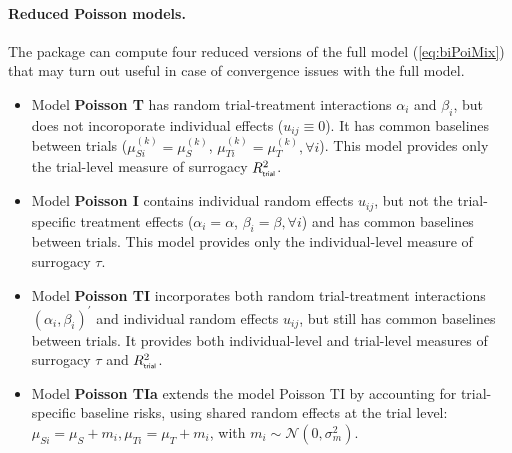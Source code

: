 \documentclass[article,shortnames, nojss]{jss}\usepackage[]{graphicx}\usepackage[]{color}
\begin{document}
\paragraph{Reduced Poisson models.}
The  package can compute four reduced versions 
  of the full model (\ref{eq:biPoiMix})
  that may turn out useful in case of convergence issues with the full model.
\begin{itemize}
\item Model \textbf{Poisson T} has
  random trial-treatment interactions $\alpha_i$ and $\beta_i$,
  but does not incoroporate individual effects ($u_{ij} \equiv 0$).
It has common baselines between trials
($\mu^{(k)}_{Si} = \mu^{(k)}_{S}$, $\mu^{(k)}_{Ti} = \mu^{(k)}_{T},
\forall i$).
This model provides only the trial-level measure of surrogacy
$R^2_{\textsf{\tiny trial}}$.

\item Model \textbf{Poisson I} contains individual random effects $u_{ij}$,
but not the trial-specific treatment effects 
($\alpha_i = \alpha$, $\beta_i = \beta, \forall i$)
and has common baselines between trials.
This model provides only the individual-level measure of surrogacy
$\tau$.

\item Model \textbf{Poisson TI} incorporates
both random trial-treatment interactions
$(\alpha_i, \beta_i)^\prime$
and individual random effects $u_{ij}$,
but still has common baselines between trials.
It provides both individual-level and trial-level measures of surrogacy
$\tau$ and $R^2_{\textsf{\tiny trial}}$.

\item Model \textbf{Poisson TIa} extends the model Poisson TI
by accounting for trial-specific baseline risks,
using shared random effects at the trial level:
$\mu_{Si} = \mu_S + m_i, \mu_{Ti} = \mu_T + m_i$,
with $m_i\sim\mathcal N(0, \sigma^2_m)$.
\end{itemize}



\end{document}
